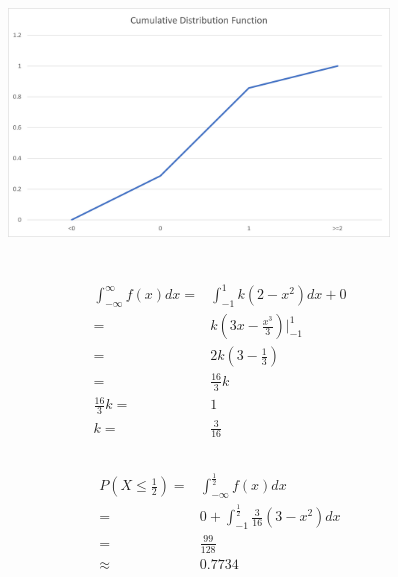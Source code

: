 \documentclass{article}
\begin{document}
        \subsection{}
            \begin{figure}[H]
                \centering
                \includegraphics[width=0.9\textwidth]{img/Assignment3-02.png}
            \end{figure}
    \section{}
        \subsection{}
            \begin{equation*}
                \begin{split}
                    \int_{-\infty}^\infty f(x)dx=&\int_{-1}^1 k(2-x^2)dx+0\\
                        =&k(3x-\frac{x^3}{3})|_{-1}^1\\
                        =&2k(3-\frac{1}{3})\\
                        =&\frac{16}{3}k\\
                    \frac{16}{3}k=&1\\
                    k=&\frac{3}{16}
                \end{split}
            \end{equation*}
        \subsection{}
            \begin{equation*}
                \begin{split}
                    P(X\leq \frac{1}{2})=&\int_{-\infty}^{\frac{1}{2}}f(x)dx\\
                        =&0+\int_{-1}^\frac{1}{2} \frac{3}{16}(3-x^2)dx\\
                        =&\frac{99}{128}\\
                        \approx&0.7734
                \end{split}
            \end{equation*}
\end{document}

